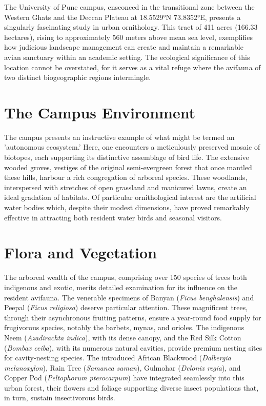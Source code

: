 \documentclass[a4paper,12pt,landscape]{memoir}
\newcommand{\introsection}[2]{%
  \begin{minipage}[t]{0.48\textwidth}
    \begin{mdframed}[
      linecolor=headingcolor,
      linewidth=1pt,
      roundcorner=5pt,
      leftmargin=0pt,
      rightmargin=0pt,
      backgroundcolor=headingcolor!5
    ]
      #1
    \end{mdframed}
  \end{minipage}\hfill
  \begin{minipage}[t]{0.48\textwidth}
    \begin{mdframed}[
      linecolor=headingcolor,
      linewidth=1pt,
      roundcorner=5pt,
      leftmargin=0pt,
      rightmargin=0pt,
      backgroundcolor=headingcolor!5
    ]
      #2
    \end{mdframed}
  \end{minipage}
  \newpage
}
\begin{document}
\introsection{%
  The University of Pune campus, ensconced in the transitional zone between the Western Ghats and the Deccan Plateau at 18.5529°N 73.8352°E, presents a singularly fascinating study in urban ornithology. This tract of 411 acres (166.33 hectares), rising to approximately 560 meters above mean sea level, exemplifies how judicious landscape management can create and maintain a remarkable avian sanctuary within an academic setting. The ecological significance of this location cannot be overstated, for it serves as a vital refuge where the avifauna of two distinct biogeographic regions intermingle.

  \section*{The Campus Environment}
  The campus presents an instructive example of what might be termed an 'autonomous ecosystem.' Here, one encounters a meticulously preserved mosaic of biotopes, each supporting its distinctive assemblage of bird life. The extensive wooded groves, vestiges of the original semi-evergreen forest that once mantled these hills, harbour a rich congregation of arboreal species. These woodlands, interspersed with stretches of open grassland and manicured lawns, create an ideal gradation of habitats. Of particular ornithological interest are the artificial water bodies which, despite their modest dimensions, have proved remarkably effective in attracting both resident water birds and seasonal visitors.

  \section*{Flora and Vegetation}
  The arboreal wealth of the campus, comprising over 150 species of trees both indigenous and exotic, merits detailed examination for its influence on the resident avifauna. The venerable specimens of Banyan (\textit{Ficus benghalensis}) and Peepal (\textit{Ficus religiosa}) deserve particular attention. These magnificent trees, through their asynchronous fruiting patterns, ensure a year-round food supply for frugivorous species, notably the barbets, mynas, and orioles. The indigenous Neem (\textit{Azadirachta indica}), with its dense canopy, and the Red Silk Cotton (\textit{Bombax ceiba}), with its numerous natural cavities, provide premium nesting sites for cavity-nesting species. The introduced African Blackwood (\textit{Dalbergia melanoxylon}), Rain Tree (\textit{Samanea saman}), Gulmohar (\textit{Delonix regia}), and Copper Pod (\textit{Peltophorum pterocarpum}) have integrated seamlessly into this urban forest, their flowers and foliage supporting diverse insect populations that, in turn, sustain insectivorous birds.
}{%
   
}
\end{document}
